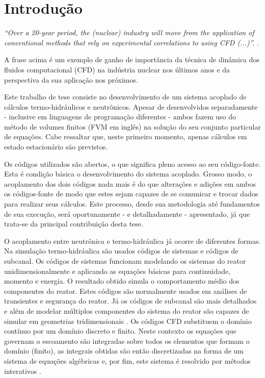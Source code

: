 \chapter*[Introdução]{Introdução}
\label{chap:introducao}

\emph{``Over a 20-year period, the (nuclear) industry will move from 
the application of conventional methods that rely on 
experimental correlations to using CFD (...)''.} \cite[p.~655]{Baglietto2011}.

A frase acima é um exemplo de ganho de importância da técnica de dinâmica dos fluidos 
computacional (CFD) na indústria nuclear nos últimos anos e da perspectiva da sua aplicação 
nos próximos.  

Este trabalho de tese consiste no desenvolvimento de um sistema acoplado de cálculos
termo-hidráulicos e neutrônicos. Apesar de desenvolvidos separadamente - inclusive
em linguagens de programação diferentes - ambos fazem uso do método de volumes
finitos\cite{Eymard2003} (FVM em inglês) na solução do seu conjunto particular de equações.
Cabe ressaltar que, neste primeiro momento, apenas cálculos em estado estacionário
são previstos.

Os códigos utilizados são abertos, o que significa pleno acesso ao seu código-fonte.
Esta é condição básica o desenvolvimento do sistema acoplado. Grosso modo, o acoplamento
dos dois códigos nada mais é do que alterações e adições em ambos os códigos-fonte de modo
que estes sejam capazes de se comunicar e trocar dados para realizar seus cálculos.
Este processo, desde sua metodologia até fundamentos de sua execução, será
oportunamente - e detalhadamente - apresentado, já que trata-se da principal
contribuição desta tese.

O acoplamento entre neutrônica e termo-hidráulica já ocorre de diferentes formas. Na simulação 
termo-hidráulica são usados códigos de sistemas e códigos de subcanal. Os códigos de sistemas 
funcionam modelando os sistemas do reator unidimensionalmente e aplicando as equações básicas 
para continuidade, momento e energia. O resultado obtido simula o
comportamento médio dos componentes do reator.
Estes códigos são normalmente usados em análises de transientes e segurança do reator. 
Já os códigos de subcanal são mais detalhados e além
de modelar múltiplos componentes do sistema 
do reator são capazes de simular em geometrias tridimensionais \cite{Faghihi2011}. Os códigos 
CFD substituem o domínio contínuo por um domínio discreto e finito. Neste contexto os equações 
que governam o escoamento são integradas sobre todos os elementos que formam o domínio (finito), 
as integrais obtidas são então discretizadas na forma de um sistema de equações algébricas 
e, por fim, este sistema é resolvido por métodos interativos \cite{Versteeg2007}.


